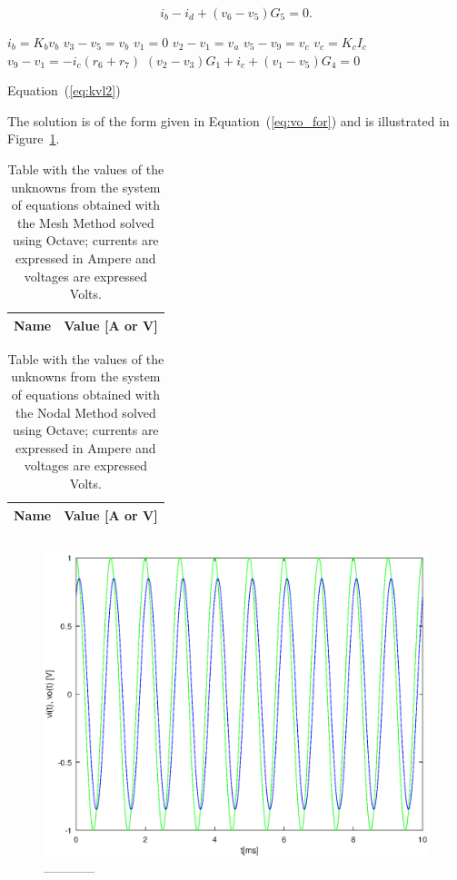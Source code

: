 \begin{equation}
  i_b - i_d + (v_6 - v_5)G_5 = 0.
  \label{eq:kvl2}
\end{equation}

$i_b = K_b v_b$
$v_3 -v_5 = v_b$
$v_1= 0$
$v_2 - v_1 = v_a$
$v_5 - v_9 = v_c$
$v_c = K_c I_c$
$v_9 - v_1 = -i_c(r_6 + r_7)$
$(v_2 - v_3)G_1 + i_c +(v_1 - v_5)G_4 = 0$

Equation~(\ref{eq:kvl2}) 

The solution is of the form given in Equation~(\ref{eq:vo_for}) and is
illustrated in Figure~\ref{fig:forced}.





\begin{table}[h]
  \centering
  \begin{tabular}{|l|r|}
    \hline    
    {\bf Name} & {\bf Value [A or V]} \\ \hline
    
  \end{tabular}
  \caption{Table with the values of the unknowns from the system of equations obtained with the Mesh Method solved using Octave; currents are expressed in Ampere and voltages are expressed Volts.}
  \label{tab:op}
\end{table}

\begin{table}[h]
  \centering
  \begin{tabular}{|l|r|}
    \hline    
    {\bf Name} & {\bf Value [A or V]} \\ \hline
    
  \end{tabular}
  \caption{Table with the values of the unknowns from the system of equations obtained with the Nodal Method solved using Octave; currents are expressed in Ampere and voltages are expressed Volts.}
  \label{tab:op}
\end{table}




\begin{equation}
  
  \label{eq:vo_for}
\end{equation}

\begin{figure}[h] \centering
\includegraphics[width=0.8\linewidth]{forced.eps}
\caption{------------}
\label{fig:forced}
\end{figure}
